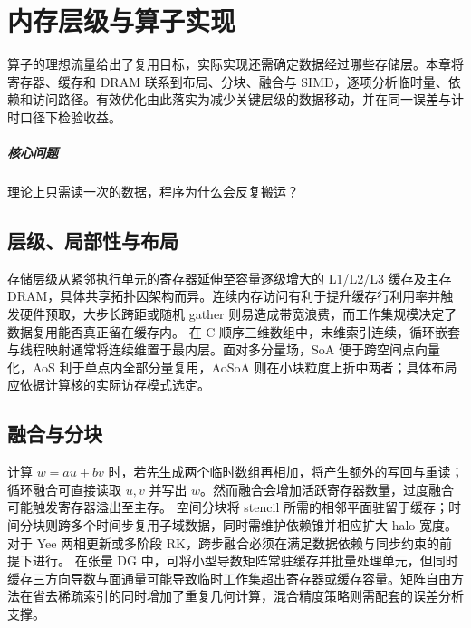 \chapter{内存层级与算子实现}\label{v0ch:26}
\begin{chaptersummary}
算子的理想流量给出了复用目标，实际实现还需确定数据经过哪些存储层。本章将寄存器、缓存和 DRAM 联系到布局、分块、融合与 SIMD，逐项分析临时量、依赖和访问路径。有效优化由此落实为减少关键层级的数据移动，并在同一误差与计时口径下检验收益。
\end{chaptersummary}
\paragraph{核心问题}理论上只需读一次的数据，程序为什么会反复搬运？

\section{层级、局部性与布局}
存储层级从紧邻执行单元的寄存器延伸至容量逐级增大的 L1/L2/L3 缓存及主存 DRAM，具体共享拓扑因架构而异。连续内存访问有利于提升缓存行利用率并触发硬件预取，大步长跨距或随机 gather 则易造成带宽浪费，而工作集规模决定了数据复用能否真正留在缓存内。
在 C 顺序三维数组中，末维索引连续，循环嵌套与线程映射通常将连续维置于最内层。面对多分量场，SoA 便于跨空间点向量化，AoS 利于单点内全部分量复用，AoSoA 则在小块粒度上折中两者；具体布局应依据计算核的实际访存模式选定。
\section{融合与分块}
计算 $w=a u+b v$ 时，若先生成两个临时数组再相加，将产生额外的写回与重读；循环融合可直接读取 $u,v$ 并写出 $w$。然而融合会增加活跃寄存器数量，过度融合可能触发寄存器溢出至主存。
空间分块将 stencil 所需的相邻平面驻留于缓存；时间分块则跨多个时间步复用子域数据，同时需维护依赖锥并相应扩大 halo 宽度。对于 Yee 两相更新或多阶段 RK，跨步融合必须在满足数据依赖与同步约束的前提下进行。
在张量 DG 中，可将小型导数矩阵常驻缓存并批量处理单元，但同时缓存三方向导数与面通量可能导致临时工作集超出寄存器或缓存容量。矩阵自由方法在省去稀疏索引的同时增加了重复几何计算，混合精度策略则需配套的误差分析支撑。
